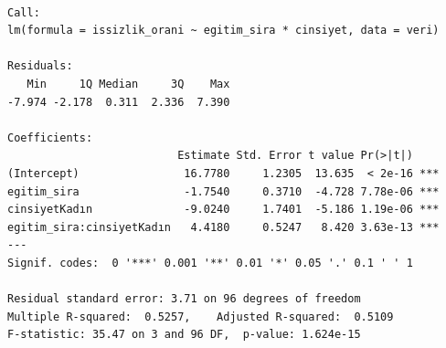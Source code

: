 \documentclass[
  11pt,
  a4paper,
  DIV=11,
  numbers=noendperiod]{scrartcl}
\begin{document}
\begin{verbatim}

Call:
lm(formula = issizlik_orani ~ egitim_sira * cinsiyet, data = veri)

Residuals:
   Min     1Q Median     3Q    Max 
-7.974 -2.178  0.311  2.336  7.390 

Coefficients:
                          Estimate Std. Error t value Pr(>|t|)    
(Intercept)                16.7780     1.2305  13.635  < 2e-16 ***
egitim_sira                -1.7540     0.3710  -4.728 7.78e-06 ***
cinsiyetKadın              -9.0240     1.7401  -5.186 1.19e-06 ***
egitim_sira:cinsiyetKadın   4.4180     0.5247   8.420 3.63e-13 ***
---
Signif. codes:  0 '***' 0.001 '**' 0.01 '*' 0.05 '.' 0.1 ' ' 1

Residual standard error: 3.71 on 96 degrees of freedom
Multiple R-squared:  0.5257,    Adjusted R-squared:  0.5109 
F-statistic: 35.47 on 3 and 96 DF,  p-value: 1.624e-15
\end{verbatim}
\end{document}
